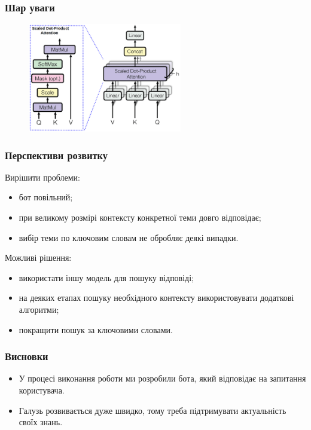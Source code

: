 \documentclass{beamer}
\begin{document}
\begin{frame}
    \frametitle{Шар уваги}
    \begin{figure}[H]
        \centering
        \includegraphics[width=0.6\textwidth]{attention_layer.png}
    \end{figure}
\end{frame}

\begin{frame}
    \frametitle{Перспективи розвитку}
    Вирішити проблеми:

    \begin{itemize}
        \item бот повільний;
        \item при великому розмірі контексту конкретної теми довго відповідає;
        \item вибір теми по ключовим словам не обробляє деякі випадки.
    \end{itemize}

    Можливі рішення:
    
    \begin{itemize}
        \item використати іншу модель для пошуку відповіді;
        \item на деяких етапах пошуку необхідного контексту використовувати додаткові алгоритми;
        \item покращити пошук за ключовими словами.
    \end{itemize}
\end{frame}

\begin{frame}
    \frametitle{Висновки}

    \begin{itemize}
        \item У процесі виконання роботи ми розробили бота, який відповідає на запитання користувача.
        \item Галузь розвивається дуже швидко, тому треба підтримувати актуальність своїх знань.
    \end{itemize}
    
\end{frame}
\end{document}
